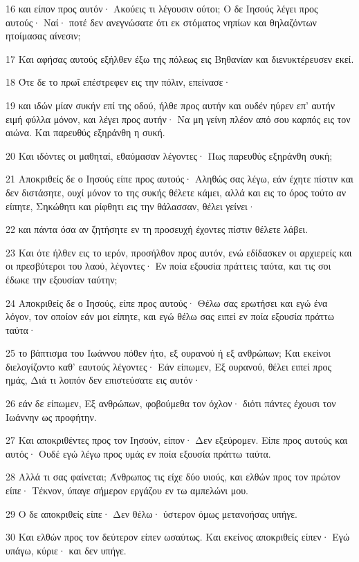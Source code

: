 \par 16 και είπον προς αυτόν· Ακούεις τι λέγουσιν ούτοι; Ο δε Ιησούς λέγει προς αυτούς· Ναί· ποτέ δεν ανεγνώσατε ότι εκ στόματος νηπίων και θηλαζόντων ητοίμασας αίνεσιν;
\par 17 Και αφήσας αυτούς εξήλθεν έξω της πόλεως εις Βηθανίαν και διενυκτέρευσεν εκεί.
\par 18 Ότε δε το πρωΐ επέστρεφεν εις την πόλιν, επείνασε·
\par 19 και ιδών μίαν συκήν επί της οδού, ήλθε προς αυτήν και ουδέν ηύρεν επ' αυτήν ειμή φύλλα μόνον, και λέγει προς αυτήν· Να μη γείνη πλέον από σου καρπός εις τον αιώνα. Και παρευθύς εξηράνθη η συκή.
\par 20 Και ιδόντες οι μαθηταί, εθαύμασαν λέγοντες· Πως παρευθύς εξηράνθη συκή;
\par 21 Αποκριθείς δε ο Ιησούς είπε προς αυτούς· Αληθώς σας λέγω, εάν έχητε πίστιν και δεν διστάσητε, ουχί μόνον το της συκής θέλετε κάμει, αλλά και εις το όρος τούτο αν είπητε, Σηκώθητι και ρίφθητι εις την θάλασσαν, θέλει γείνει·
\par 22 και πάντα όσα αν ζητήσητε εν τη προσευχή έχοντες πίστιν θέλετε λάβει.
\par 23 Και ότε ήλθεν εις το ιερόν, προσήλθον προς αυτόν, ενώ εδίδασκεν οι αρχιερείς και οι πρεσβύτεροι του λαού, λέγοντες· Εν ποία εξουσία πράττεις ταύτα, και τις σοι έδωκε την εξουσίαν ταύτην;
\par 24 Αποκριθείς δε ο Ιησούς, είπε προς αυτούς· Θέλω σας ερωτήσει και εγώ ένα λόγον, τον οποίον εάν μοι είπητε, και εγώ θέλω σας ειπεί εν ποία εξουσία πράττω ταύτα·
\par 25 το βάπτισμα του Ιωάννου πόθεν ήτο, εξ ουρανού ή εξ ανθρώπων; Και εκείνοι διελογίζοντο καθ' εαυτούς λέγοντες· Εάν είπωμεν, Εξ ουρανού, θέλει ειπεί προς ημάς, Διά τι λοιπόν δεν επιστεύσατε εις αυτόν·
\par 26 εάν δε είπωμεν, Εξ ανθρώπων, φοβούμεθα τον όχλον· διότι πάντες έχουσι τον Ιωάννην ως προφήτην.
\par 27 Και αποκριθέντες προς τον Ιησούν, είπον· Δεν εξεύρομεν. Είπε προς αυτούς και αυτός· Ουδέ εγώ λέγω προς υμάς εν ποία εξουσία πράττω ταύτα.
\par 28 Αλλά τι σας φαίνεται; Άνθρωπος τις είχε δύο υιούς, και ελθών προς τον πρώτον είπε· Τέκνον, ύπαγε σήμερον εργάζου εν τω αμπελώνι μου.
\par 29 Ο δε αποκριθείς είπε· Δεν θέλω· ύστερον όμως μετανοήσας υπήγε.
\par 30 Και ελθών προς τον δεύτερον είπεν ωσαύτως. Και εκείνος αποκριθείς είπεν· Εγώ υπάγω, κύριε· και δεν υπήγε.

